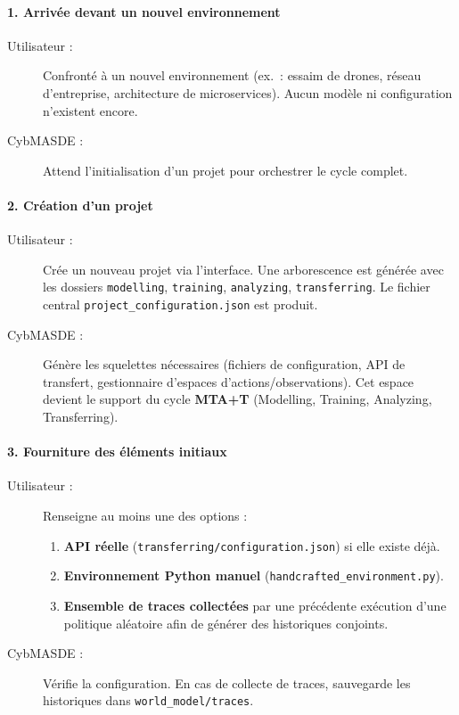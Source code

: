 \paragraph{1. Arrivée devant un nouvel environnement}
\begin{description}
  \item[Utilisateur :] Confronté à un nouvel environnement (ex.~: essaim de drones, réseau d’entreprise, architecture de microservices). Aucun modèle ni configuration n’existent encore.
  \item[CybMASDE :] Attend l’initialisation d’un projet pour orchestrer le cycle complet.
\end{description}

\paragraph{2. Création d’un projet}
\begin{description}
  \item[Utilisateur :] Crée un nouveau projet via l’interface. Une arborescence est générée avec les dossiers \texttt{modelling}, \texttt{training}, \texttt{analyzing}, \texttt{transferring}. Le fichier central \texttt{project\_configuration.json} est produit.
  \item[CybMASDE :] Génère les squelettes nécessaires (fichiers de configuration, API de transfert, gestionnaire d’espaces d’actions/observations). Cet espace devient le support du cycle \textbf{MTA+T} (Modelling, Training, Analyzing, Transferring).
\end{description}

\paragraph{3. Fourniture des éléments initiaux}
\begin{description}
  \item[Utilisateur :] Renseigne au moins une des options :
    \begin{enumerate}
      \item \textbf{API réelle} (\texttt{transferring/configuration.json}) si elle existe déjà.
      \item \textbf{Environnement Python manuel} (\texttt{handcrafted\_environment.py}).
      \item \textbf{Ensemble de traces collectées} par une précédente exécution d’une politique aléatoire afin de générer des historiques conjoints.
    \end{enumerate}
  \item[CybMASDE :] Vérifie la configuration. En cas de collecte de traces, sauvegarde les historiques dans \texttt{world\_model/traces}.
\end{description}

